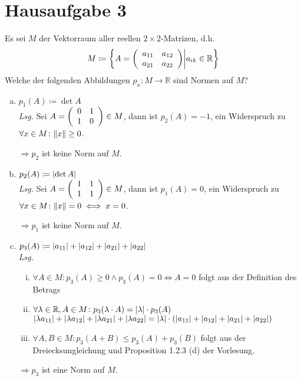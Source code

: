 \documentclass{scrreprt}
\begin{document}
\newpage
\section*{Hausaufgabe 3}

Es sei $M$ der Vektorraum aller reellen $2 \times 2$-Matrizen, d.h.
\[
  M \coloneqq \qty{A = \qty(\begin{array}{cc} a_{11} & a_{12} \\ a_{21} & a_{22}\end{array}) \middle| a_{ik} \in \mathbb{R}}
\]
Welche der folgenden Abbildungen $p_x \colon M \to \mathbb{R}$ sind Normen auf $M$?
\begin{enumerate}[a)]
\item $p_1(A) \coloneqq \det A$ \\

  \textit{Lsg.} Sei $A = \qty(\begin{array}{cc}0&1\\1&0\end{array}) \in M$,
  dann ist $p_2(A) = -1$, ein Widerspruch zu
  $\forall x \in M \colon \norm{x} \geq 0$.

  $\Rightarrow p_2$ ist keine Norm auf $M$.

\item $p_2(A) \coloneqq \abs{\det A}$ \\

  \textit{Lsg.} Sei $A = \qty(\begin{array}{cc}1&1\\1&1\end{array}) \in M$,
  dann ist $p_1(A) = 0$, ein Widerspruch zu
  $\forall x \in M \colon \norm{x} = 0 \iff x = 0$.

  $\Rightarrow p_1$ ist keine Norm auf $M$.

\item $p_3(A) \coloneqq \abs{a_{11}} + \abs{a_{12}} + \abs{a_{21}} + \abs{a_{22}}$ \\

  \textit{Lsg.}
  \begin{enumerate}[(i)]
  \item $\forall A \in M \colon p_3(A) \geq 0 \land p_3(A) = 0 \iff A = 0$ folgt aus der Definition des Betrags
  \item $\forall \lambda \in \mathbb{R}, A \in M \colon p_3(\lambda \cdot A) = \abs{\lambda} \cdot p_3(A)$ \\
    $\abs{\lambda a_{11}} + \abs{\lambda a_{12}} + \abs{\lambda a_{21}} + \abs{\lambda a_{22}} =
    \abs{\lambda} \cdot \qty(\abs{a_{11}} + \abs{a_{12}} + \abs{a_{21}} + \abs{a_{22}})$
  \item $\forall A, B \in M \colon p_3(A + B) \leq p_3(A) + p_3(B)$
    folgt aus der Dreiecksungleichung und Proposition 1.2.3 (d) der Vorlesung.
  \end{enumerate}
  $\Rightarrow p_3$ ist eine Norm auf $M$.


\end{enumerate}
\end{document}
